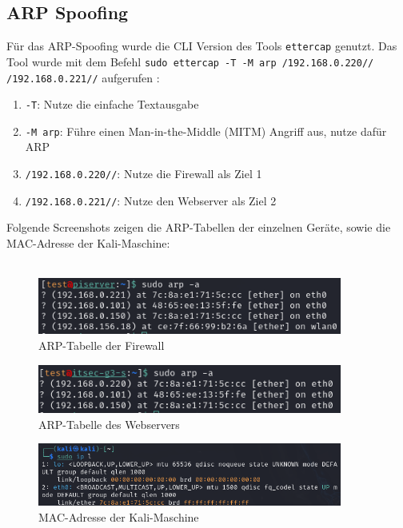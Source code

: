 \documentclass[
    a4paper,
    pagesize,
	pdftex,
    12pt,
]{scrartcl}
\begin{document}
\subsection{ARP Spoofing}
Für das ARP-Spoofing wurde die CLI Version des Tools \lstinline[breaklines]|ettercap| genutzt. Das Tool wurde mit dem Befehl \lstinline[breaklines]|sudo ettercap -T -M arp /192.168.0.220// /192.168.0.221//| aufgerufen \cite{ettercap-manual}:
\begin{enumerate}
	\item \lstinline[breaklines]|-T|: Nutze die einfache Textausgabe
	\item \lstinline[breaklines]|-M arp|: Führe einen Man-in-the-Middle (MITM) Angriff aus, nutze dafür ARP
	\item \lstinline[breaklines]|/192.168.0.220//|: Nutze die Firewall als Ziel 1
	\item \lstinline[breaklines]|/192.168.0.221//|: Nutze den Webserver als Ziel 2
\end{enumerate}
Folgende Screenshots zeigen die ARP-Tabellen der einzelnen Geräte, sowie die MAC-Adresse der Kali-Maschine: \\ \\
\begin{figure}[!ht]
	\centering
	\includegraphics[width=10cm]{arp-firewall.png}
	\caption{ARP-Tabelle der Firewall}
	\label{fig:arp-firewall}
\end{figure}
\begin{figure}[!ht]
	\centering
	\includegraphics[width=10cm]{arp-webserver.png}
	\caption{ARP-Tabelle des Webservers}
	\label{fig:arp-webserver}
\end{figure}
\begin{figure}[!ht]
	\centering
	\includegraphics[width=10cm]{arp-mac-kali.png}
	\caption{MAC-Adresse der Kali-Maschine}
	\label{fig:arp-mac-kali}
\end{figure} 
\end{document}
